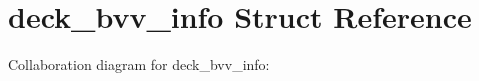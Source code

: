 \hypertarget{structdeck__bvv__info}{}\section{deck\+\_\+bvv\+\_\+info Struct Reference}
\label{structdeck__bvv__info}


Collaboration diagram for deck\+\_\+bvv\+\_\+info\+:

